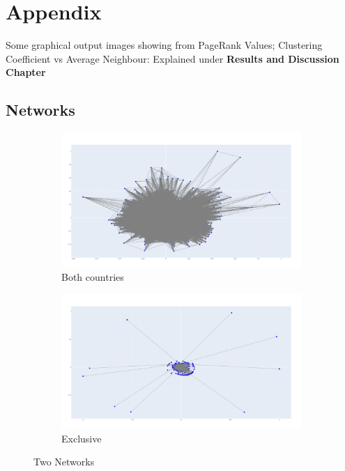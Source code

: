 

\section{Appendix}

Some graphical output images showing from PageRank Values; Clustering Coefficient vs Average Neighbour: Explained under \textbf{Results and Discussion Chapter}

\subsection{Networks}

\begin{figure}[H]
     \centering
     \begin{subfigure}{0.48\textwidth}
         \includegraphics[width=\textwidth]{images/networks/graph-ALL.png}
         \caption{Both countries}
         \label{fig:both}
     \end{subfigure}
     \hfill
     \begin{subfigure}{0.48\textwidth}
         \includegraphics[width=\textwidth]{images/networks/graph-OTHERS.png}
         \caption{Exclusive}
         \label{fig:exclusive}
     \end{subfigure}
     \caption{Two Networks}
     \label{fig:two networks}
\end{figure}


